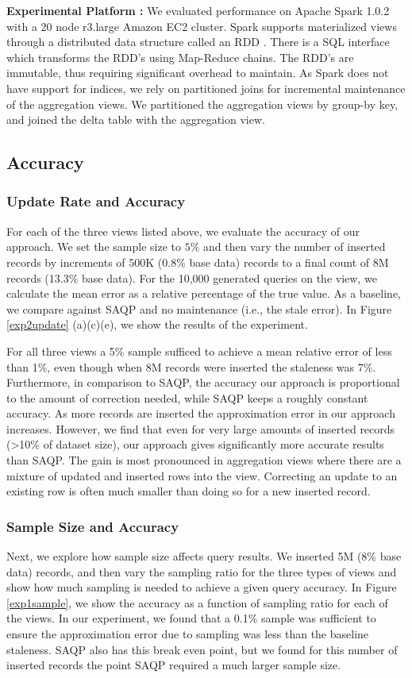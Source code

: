 {\noindent \bf Experimental Platform :}
We evaluated performance on Apache Spark 1.0.2 with a 20 node r3.large Amazon EC2 cluster.
Spark supports materialized views through a distributed data structure called an RDD \cite{zaharia2012resilient}.
There is a SQL interface which transforms the RDD's using Map-Reduce chains.
The RDD's are immutable, thus requiring significant overhead to maintain.
As Spark does not have support for indices, we rely on partitioned joins for incremental maintenance of the aggregation views.
We partitioned the aggregation views by group-by key, and joined the delta table with the aggregation view.

\subsection{Accuracy}
\vspace{-.5em}
\subsubsection{Update Rate and Accuracy}\label{exp:tpcd-acc}
For each of the three views listed above, we evaluate the accuracy of our approach.
We set the sample size to $5\%$ and then vary the number of inserted records by increments of 500K (0.8\% base data) records to a final count of 8M records (13.3\% base data).
For the 10,000 generated queries on the view, we calculate the mean error as a relative percentage of the true value.
As a baseline, we compare against SAQP and no maintenance (i.e., the stale error).
In Figure \ref{exp2update} (a)(c)(e), we show the results of the experiment. 

For all three views a 5\% sample sufficed to achieve a mean relative error of less than 1\%, even though when 8M records were inserted the staleness was 7\%.
Furthermore, in comparison to SAQP, the accuracy our approach is proportional to the amount of correction needed, while SAQP keeps a roughly constant accuracy.
As more records are inserted the approximation error in our approach increases.
However, we find that even for very large amounts of inserted records (>10\% of dataset size), our approach gives significantly more accurate results
than SAQP.
The gain is most pronounced in aggregation views where there are a mixture of updated and inserted rows into the view.
Correcting an update to an existing row is often much smaller than doing so for a new inserted record.

\subsubsection{Sample Size and Accuracy} Next, we explore how sample size affects query results.
We inserted 5M (8\% base data) records, and then vary the sampling ratio for the three types of views and show how much sampling is needed to achieve a given query accuracy.
In Figure \ref{exp1sample}, we show the accuracy as a function of sampling ratio for each of the views.
In our experiment, we found that a 0.1\% sample was sufficient to ensure the approximation error due to sampling was less than the baseline staleness.
SAQP also has this break even point, but we found for this number of inserted records the point SAQP required a much larger sample size.

